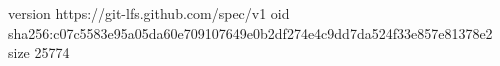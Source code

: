 version https://git-lfs.github.com/spec/v1
oid sha256:c07c5583e95a05da60e709107649e0b2df274e4c9dd7da524f33e857e81378e2
size 25774
